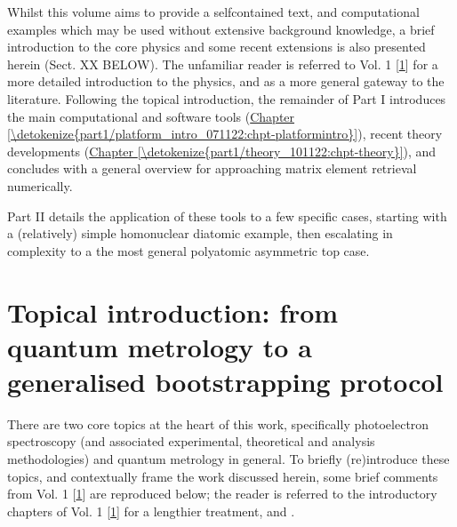 \documentclass[letterpaper,table,10pt,english]{jupyterBook}
\begin{document}
\sphinxAtStartPar
Whilst this volume aims to provide a self\sphinxhyphen{}contained text, and computational examples which may be used without extensive background knowledge, a brief introduction to the core physics and some recent extensions is also presented herein (Sect. XX BELOW). The unfamiliar reader is referred to  Vol. 1 {[}\hyperlink{cite.backmatter/bibliography:id569}{1}{]} for a more detailed introduction to the physics, and as a more general gateway to the literature. Following the topical introduction, the remainder of Part I introduces the main computational and software tools (\hyperref[\detokenize{part1/platform_intro_071122:chpt-platformintro}]{Chapter \ref{\detokenize{part1/platform_intro_071122:chpt-platformintro}}}), recent theory developments (\hyperref[\detokenize{part1/theory_101122:chpt-theory}]{Chapter \ref{\detokenize{part1/theory_101122:chpt-theory}}}), and concludes with a general overview for approaching matrix element retrieval numerically.

\sphinxAtStartPar
Part II details the application of these tools to a few specific cases, starting with a (relatively) simple homonuclear diatomic example, then escalating in complexity to a the most general polyatomic asymmetric top case.


\section{Topical introduction: from quantum metrology to a generalised bootstrapping protocol}
\label{\detokenize{part1/main_intro_051122:topical-introduction-from-quantum-metrology-to-a-generalised-bootstrapping-protocol}}\label{\detokenize{part1/main_intro_051122:sec-topical-intro}}
\sphinxAtStartPar
There are two core topics at the heart of this work, specifically photoelectron spectroscopy (and associated experimental, theoretical and analysis methodologies) and quantum metrology in general. To briefly (re)introduce these topics, and contextually frame the work discussed herein, some brief comments from  Vol. 1 {[}\hyperlink{cite.backmatter/bibliography:id569}{1}{]} are reproduced below; the reader is referred to the introductory chapters of  Vol. 1 {[}\hyperlink{cite.backmatter/bibliography:id569}{1}{]} for a lengthier treatment, and .
\end{document}
